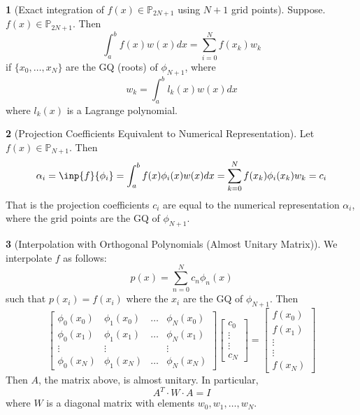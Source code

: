 \documentclass[12pt]{article}
\theoremstyle{definition}
\newtheorem{theorem}{\color{ForestGreen}{\textbf{Theorem}}}
\begin{document}
\begin{theorem}[Exact integration of $f(x) \in \mathbb{P}_{2N+1}$ using $N+1$ grid points]
Suppose. $f(x) \in \mathbb{P}_{2N+1}$. Then
\begin{equation}
\int_{a}^b f(x)w(x)dx = \sum_{i=0}^N f(x_k) w_k
\end{equation}
if $\{x_0, \ldots, x_N\}$ are the GQ (roots) of $\phi_{N+1}$, where
\begin{equation}
w_k = \int_a^b l_k(x)w(x)dx
\end{equation}
where $l_k(x)$ is a Lagrange polynomial.
\end{theorem}

\begin{theorem}[Projection Coefficients Equivalent to Numerical Representation]
Let $f(x) \in \mathbb{P}_{N+1}$. Then
\begin{equation}
\alpha_i = \inp{f}{\phi_i} = \int_a^b f(x)\phi_i(x)w(x)dx = \sum_{k=0}^N f(x_k)\phi_i(x_k)w_k = c_i
\end{equation}
That is the projection coefficients $c_i$ are equal to the numerical representation $\alpha_i$, where the grid points are the GQ of $\phi_{N+1}$.
\end{theorem}

\begin{theorem}[Interpolation with Orthogonal Polynomials (Almost Unitary Matrix)]
We interpolate $f$ as follows:
\begin{equation}
p(x) = \sum_{n=0}^N c_n \phi_n(x)
\end{equation}
such that $p(x_i) = f(x_i)$ where the $x_i$ are the GQ of $\phi_{N+1}$. Then
\begin{equation}
\begin{bmatrix}
\phi_0(x_0) & \phi_1(x_0) & \hdots & \phi_N(x_0) \\
\phi_0(x_1) & \phi_1(x_1) & \hdots & \phi_N(x_1) \\
\vdots & \vdots & & \vdots  \\
\phi_0(x_N) & \phi_1(x_N) & \hdots & \phi_N(x_N)
\end{bmatrix}
\begin{bmatrix}
c_0 \\ \vdots \\ \vdots \\ c_N
\end{bmatrix}
=
\begin{bmatrix}
f(x_0) \\ f(x_1) \\ \vdots \\ \vdots  \\ f(x_N)
\end{bmatrix}
\end{equation}
Then $A$, the matrix above, is almost unitary. In particular,
\begin{equation}
A^T \cdot W \cdot A = I
\end{equation}
where $W$ is a diagonal matrix with elements $w_0, w_1, \ldots, w_N$.
\end{theorem}
\end{document}

